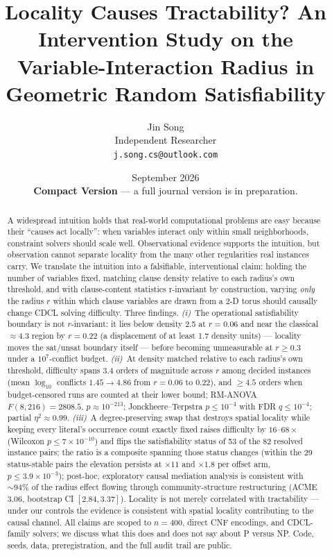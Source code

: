 \documentclass[11pt]{article}
\title{Locality Causes Tractability? An Intervention Study on the\\
Variable-Interaction Radius in Geometric Random Satisfiability}
\author{Jin Song\\
\small Independent Researcher\\\texttt{j.song.cs@outlook.com}}
\date{September 2026\\
\small \textbf{Compact Version} --- a full journal version is in preparation.}
\begin{document}
\maketitle

\begin{abstract}
A widespread intuition holds that real-world computational problems are easy
because their ``causes act locally'': when variables interact only within small
neighborhoods, constraint solvers should scale well. Observational evidence
supports the intuition, but observation cannot separate locality from the many
other regularities real instances carry. We translate the intuition into a
falsifiable, interventional claim: holding the number of variables
fixed, matching clause density relative to each radius's own threshold, and
with clause-content statistics r-invariant by construction, varying
\emph{only} the radius $r$ within which clause variables are drawn from a 2-D
torus should causally change CDCL solving difficulty. Three findings.
\emph{(i)}~The operational satisfiability boundary is not $r$-invariant: it
lies below density 2.5 at $r=0.06$ and near the classical ${\approx}4.3$
region by $r=0.22$ (a displacement of at least 1.7 density units) ---
locality moves the sat/unsat boundary itself --- before becoming unmeasurable
at $r\ge 0.3$ under a $10^7$-conflict budget. \emph{(ii)}~At density matched relative to each
radius's own threshold, difficulty spans $3.4$ orders of magnitude across $r$
among decided instances (mean $\log_{10}$ conflicts $1.45 \to 4.86$ from
$r=0.06$ to $0.22$), and $\ge 4.5$ orders when budget-censored runs are
counted at their lower bound; RM-ANOVA $F(8,216)=2808.5$, $p\approx10^{-213}$;
Jonckheere--Terpstra $p\le 10^{-4}$ with FDR $q\le 10^{-4}$; partial
$\eta^2 \approx 0.99$. \emph{(iii)}~A degree-preserving swap that destroys
spatial locality while keeping every literal's occurrence count exactly fixed
raises difficulty by $16$--$68\times$ (Wilcoxon $p\le 7\times10^{-10}$) and
flips the satisfiability status of 53 of the 82 resolved instance pairs;
the ratio is a composite spanning those status changes (within the 29
status-stable pairs the elevation persists at $\times 11$ and $\times 1.8$
per offset arm,
$p\le 3.9\times10^{-3}$); post-hoc, exploratory
causal mediation analysis is consistent with ${\sim}94\%$ of the radius effect
flowing through community-structure
restructuring (ACME 3.06, bootstrap CI $[2.84, 3.37]$). Locality is not merely
correlated with tractability --- under our controls the evidence is consistent
with spatial locality contributing to the causal channel.
All claims are scoped to $n=400$, direct CNF encodings, and CDCL-family
solvers; we discuss what this does and does not say about P versus NP. Code,
seeds, data, preregistration, and the full audit trail are public.
\end{abstract}
\end{document}
